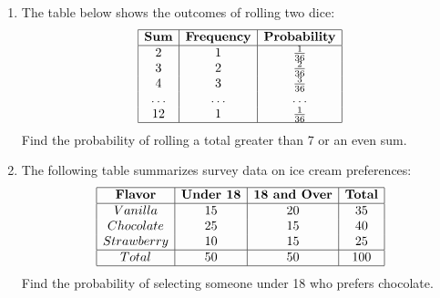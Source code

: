 \begin{enumerate}[label=\color{blue}\arabic*.]
    \item The table below shows the outcomes of rolling two dice:
    \[
    \begin{array}{|c|c|c|c|}
        \hline
        \textbf{Sum} & \textbf{Frequency} & \textbf{Probability} \\
        \hline
        2 & 1 & \frac{1}{36} \\
        3 & 2 & \frac{2}{36} \\
        4 & 3 & \frac{3}{36} \\
        \ldots & \ldots & \ldots \\
        12 & 1 & \frac{1}{36} \\
        \hline
    \end{array}
    \]
    Find the probability of rolling a total greater than 7 or an even sum.
    
    \item The following table summarizes survey data on ice cream preferences:
    \[
    \begin{array}{|c|c|c|c|}
        \hline
        \textbf{Flavor} & \textbf{Under 18} & \textbf{18 and Over} & \textbf{Total} \\
        \hline
        Vanilla & 15 & 20 & 35 \\
        Chocolate & 25 & 15 & 40 \\
        Strawberry & 10 & 15 & 25 \\
        \hline
        Total & 50 & 50 & 100 \\
        \hline
    \end{array}
    \]
    Find the probability of selecting someone under 18 who prefers chocolate.
\end{enumerate}
